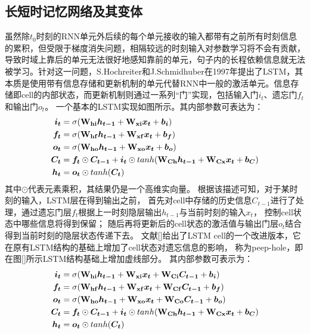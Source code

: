 \subsection{长短时记忆网络及其变体}
虽然除$t_0$时刻的RNN单元外后续的每个单元接收的输入都带有之前所有时刻信息的累积，但受限于梯度消失问题，相隔较远的时刻输入对参数学习将不会有贡献，导致时域上靠后的单元无法很好地感知靠前的单元，句子内的长程依赖信息就无法被学习。针对这一问题，S.Hochreiter和J.Schmidhuber在1997年提出了LSTM，其本质是使用带有信息存储和更新机制的单元代替RNN中一般的激活单元。信息存储即cell的内部状态，而更新机制则通过一系列“门”实现，包括输入门$i_t$、遗忘门$f_t$和输出门$o_t$。
一个基本的LSTM实现如图所示。其内部参数可表达为：
\begin{align*}
    \boldsymbol{i_t} &= \sigma(\boldsymbol{\mathbf{W_{hi}}}\boldsymbol{h_{t-1}} + \boldsymbol{\mathbf{W_{xi}}}\boldsymbol{x_{t}} + \boldsymbol{b_i})\\
    \boldsymbol{f_t} &= \sigma(\boldsymbol{\mathbf{W_{hf}}}\boldsymbol{h_{t-1}} + \boldsymbol{\mathbf{W_{xf}}}\boldsymbol{x_{t}} + \boldsymbol{b_f})\\
    \boldsymbol{o_t} &= \sigma(\boldsymbol{\mathbf{W_{ho}}}\boldsymbol{h_{t-1}} + \boldsymbol{\mathbf{W_{xo}}}\boldsymbol{x_{t}} + \boldsymbol{b_o})\\
    \boldsymbol{C_t} &= \boldsymbol{f_t}\odot\boldsymbol{C_{t-1}} + \boldsymbol{i_t}\odot tanh(\boldsymbol{\mathbf{W_{Ch}}}\boldsymbol{h_{t-1}} + \boldsymbol{\mathbf{W_{Cx}}}\boldsymbol{x_t} + \boldsymbol{b_{C}})\\
    \boldsymbol{h_t} &= \boldsymbol{o_t} \odot tanh(\boldsymbol{C_t})
\end{align*}
其中$\odot$代表元素乘积，其结果仍是一个高维实向量。
根据该描述可知，对于某时刻的输入，LSTM层在得到输出之前，
首先对cell中存储的历史信息$C_{t-1}$进行了处理，通过遗忘门层$f_t$根据上一时刻隐层输出$h_{t-1}$与当前时刻的输入$x_t$，
控制cell状态中哪些信息将得到保留；
随后再将更新后的cell状态的激活值与输出门层$o_t$结合得到当前时刻的隐层状态传递下去。
文献[]给出了LSTM cell的一个改进版本，它在原有LSTM结构的基础上增加了cell状态对遗忘信息的影响，
称为peep-hole，即在图[]所示LSTM结构基础上增加虚线部分。
其内部参数可表示为：
\begin{align*}
    \boldsymbol{i_t} &= \sigma(\boldsymbol{\mathbf{W_{hi}}}\boldsymbol{h_{t-1}} + \boldsymbol{\mathbf{W_{xi}}}\boldsymbol{x_{t}} + \boldsymbol{\mathbf{W_{Ci}}}\boldsymbol{C_{t-1}} + \boldsymbol{b_i})\\
    \boldsymbol{f_t} &= \sigma(\boldsymbol{\mathbf{W_{hf}}}\boldsymbol{h_{t-1}} + \boldsymbol{\mathbf{W_{xf}}}\boldsymbol{x_{t}} + \boldsymbol{\mathbf{W_{Cf}}}\boldsymbol{C_{t-1}} + \boldsymbol{b_f})\\
    \boldsymbol{o_t} &= \sigma(\boldsymbol{\mathbf{W_{ho}}}\boldsymbol{h_{t-1}} + \boldsymbol{\mathbf{W_{xo}}}\boldsymbol{x_{t}} + \boldsymbol{\mathbf{W_{Co}}}\boldsymbol{C_{t-1}} + \boldsymbol{b_o})\\
    \boldsymbol{C_t} &= \boldsymbol{f_t}\odot\boldsymbol{C_{t-1}} + \boldsymbol{i_t}\odot tanh(\boldsymbol{\mathbf{W_{Ch}}}\boldsymbol{h_{t-1}} + \boldsymbol{\mathbf{W_{Cx}}}\boldsymbol{x_t} + \boldsymbol{b_{C}})\\
    \boldsymbol{h_t} &= \boldsymbol{o_t} \odot tanh(\boldsymbol{C_t})
\end{align*}
